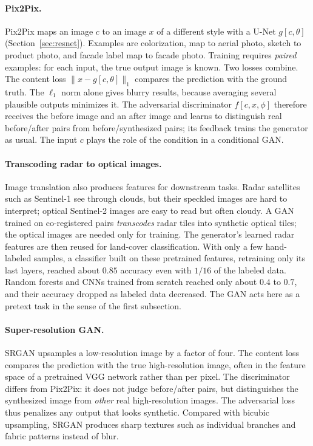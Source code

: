 \paragraph{Pix2Pix.}
Pix2Pix maps an image $c$ to an image $x$ of a different style with a U-Net
$g[c,\theta]$ (Section~\ref{sec:resnet}). Examples are colorization, map to
aerial photo, sketch to product photo, and facade label map to facade photo.
Training requires \emph{paired} examples: for each input, the true output
image is known. Two losses combine. The content loss $\|x-g[c,\theta]\|_1$
compares the prediction with the ground truth. The $\ell_1$ norm alone gives
blurry results, because averaging several plausible outputs minimizes it. The
adversarial discriminator $f[c,x,\phi]$ therefore receives the before image and
an after image and learns to distinguish real before/after pairs from
before/synthesized pairs; its feedback trains the generator as usual. The input
$c$ plays the role of the condition in a conditional GAN.

\paragraph{Transcoding radar to optical images.}
Image translation also produces features for downstream tasks. Radar
satellites such as Sentinel-1 see through clouds, but their speckled images are
hard to interpret; optical Sentinel-2 images are easy to read but often cloudy.
A GAN trained on co-registered pairs \emph{transcodes} radar tiles into
synthetic optical tiles; the optical images are needed only for training. The
generator's learned radar features are then reused for land-cover
classification. With only a few hand-labeled samples, a classifier built on
these pretrained features, retraining only its last layers, reached about
$0.85$ accuracy even with $1/16$ of the labeled data. Random forests and CNNs
trained from scratch reached only about $0.4$ to $0.7$, and their accuracy
dropped as labeled data decreased. The GAN acts here as a pretext task in the
sense of the first subsection.

\paragraph{Super-resolution GAN.}
SRGAN upsamples a low-resolution image by a factor of four. The content loss
compares the prediction with the true high-resolution image, often in the
feature space of a pretrained VGG network rather than per pixel. The
discriminator differs from Pix2Pix: it does not judge before/after pairs, but
distinguishes the synthesized image from \emph{other} real high-resolution
images. The adversarial loss thus penalizes any output that looks synthetic.
Compared with bicubic upsampling, SRGAN produces sharp textures such as
individual branches and fabric patterns instead of blur.

